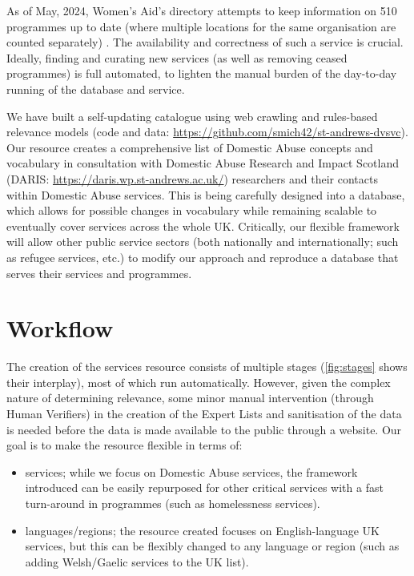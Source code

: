 \documentclass[conference]{IEEEtran}
\begin{document}
As of May, 2024, Women's Aid's directory attempts to keep information on 510 programmes up to date (where multiple locations for the same organisation are counted separately) \cite{wadir}.
The availability and correctness of such a service is crucial. 
Ideally, finding and curating new services (as well as removing ceased programmes) is full automated, to lighten the manual burden of the day-to-day running of the database and service.

We have built a self-updating catalogue using web crawling and rules-based relevance models (code and data: \url{https://github.com/smich42/st-andrews-dvsvc}).
Our resource creates a comprehensive list of Domestic Abuse concepts and vocabulary in consultation with Domestic Abuse Research and Impact Scotland (DARIS: \url{https://daris.wp.st-andrews.ac.uk/}) researchers and their contacts within Domestic Abuse services. 
This is being carefully designed into a database, which allows for possible changes in vocabulary while remaining scalable to eventually cover services across the whole UK. 
Critically, our flexible framework will allow other public service sectors (both nationally and internationally; such as refugee services, etc.) to modify our approach and reproduce a database that serves their services and programmes.



\section{Workflow}
\label{sec:flow}
The creation of the services resource consists of multiple stages (\cref{fig:stages} shows their interplay), most of which run automatically. However, given the complex nature of determining relevance, some minor manual intervention (through Human Verifiers) in the creation of the Expert Lists and sanitisation of the data is needed before the data is made available to the public through a website.
Our goal is to make the resource flexible in terms of:
\begin{itemize}
    \item services; while we focus on Domestic Abuse services, the framework introduced can be easily repurposed for other critical services with a fast turn-around in programmes (such as homelessness services).
    \item languages/regions; the resource created focuses on English-language UK services, but this can be flexibly changed to any language or region (such as adding Welsh/Gaelic services to the UK list).
\end{itemize}
\end{document}
